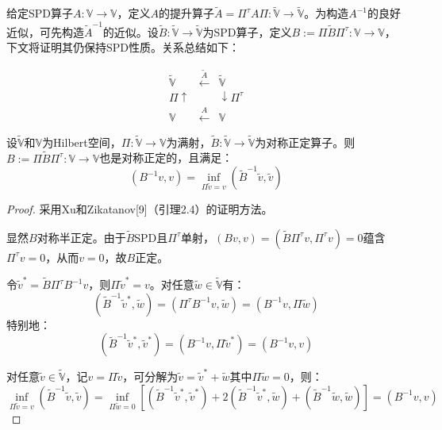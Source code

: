 \documentclass[letterpaper,12pt]{article}
\begin{document}
给定SPD算子$A:\mathbb{\mathbb{V}}\to\mathbb{\mathbb{V}}$，定义$A$的提升算子$\tilde{A}=\Pi^{\tau}A\Pi:\tilde{\mathbb{\mathbb{V}}}\to\tilde{\mathbb{\mathbb{V}}}$。为构造$A^{-1}$的良好近似，可先构造$\tilde{A}^{-1}$的近似。设$\tilde{B}:\tilde{\mathbb{\mathbb{V}}}\to\tilde{\mathbb{\mathbb{V}}}$为SPD算子，定义$B:=\Pi\tilde{B}\Pi^{\tau}:\mathbb{\mathbb{V}}\to\mathbb{\mathbb{V}}$，下文将证明其仍保持SPD性质。关系总结如下：

\[
\begin{array}{ccc}
\tilde{\mathbb{\mathbb{V}}} & \stackrel{\tilde{A}}{\longleftarrow} & \tilde{\mathbb{\mathbb{V}}} \\
\Pi \uparrow & & \downarrow \Pi^{\tau} \\
\mathbb{\mathbb{V}} & \stackrel{A}{\longleftarrow} & \mathbb{\mathbb{V}}
\end{array}
\]

\begin{theorem}[2.1]
设$\tilde{\mathbb{\mathbb{V}}}$和$\mathbb{\mathbb{V}}$为Hilbert空间，$\Pi:\tilde{\mathbb{\mathbb{V}}}\to\mathbb{\mathbb{V}}$为满射，$\tilde{B}:\tilde{\mathbb{\mathbb{V}}}\to\tilde{\mathbb{\mathbb{V}}}$为对称正定算子。则$B:=\Pi\tilde{B}\Pi^{\tau}:\mathbb{\mathbb{V}}\to\mathbb{\mathbb{V}}$也是对称正定的，且满足：
\[ (B^{-1}v,v) = \inf_{\Pi\tilde{v}=v} (\tilde{B}^{-1}\tilde{v},\tilde{v}) \]
\end{theorem}

\begin{proof}
采用Xu和Zikatanov[9]（引理2.4）的证明方法。

显然$B$对称半正定。由于$\tilde{B}$SPD且$\Pi^{\tau}$单射，$(Bv,v)=(\tilde{B}\Pi^{\tau}v,\Pi^{\tau}v)=0$蕴含$\Pi^{\tau}v=0$，从而$v=0$，故$B$正定。

令$\tilde{v}^{*}=\tilde{B}\Pi^{\tau}B^{-1}v$，则$\Pi\tilde{v}^{*}=v$。对任意$\tilde{w}\in\tilde{\mathbb{\mathbb{V}}}$有：
\[ (\tilde{B}^{-1}\tilde{v}^{*},\tilde{w}) = (\Pi^{\tau}B^{-1}v,\tilde{w}) = (B^{-1}v,\Pi\tilde{w}) \]
特别地：
\[ (\tilde{B}^{-1}\tilde{v}^{*},\tilde{v}^{*}) = (B^{-1}v,\Pi\tilde{v}^{*}) = (B^{-1}v,v) \]

对任意$\tilde{v}\in\tilde{\mathbb{\mathbb{V}}}$，记$v=\Pi\tilde{v}$，可分解为$\tilde{v}=\tilde{v}^{*}+\tilde{w}$其中$\Pi\tilde{w}=0$，则：
\[
\inf_{\Pi\tilde{v}=v} (\tilde{B}^{-1}\tilde{v},\tilde{v}) = \inf_{\Pi\tilde{w}=0} [ (\tilde{B}^{-1}\tilde{v}^{*},\tilde{v}^{*}) + 2(\tilde{B}^{-1}\tilde{v}^{*},\tilde{w}) + (\tilde{B}^{-1}\tilde{w},\tilde{w}) ] = (B^{-1}v,v)
\]
\end{proof}
\end{document}
